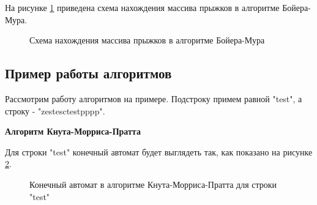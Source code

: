 \documentclass[a4paper, 14pt]{article}
\begin{document}
        На рисунке \ref{fig:jmp} приведена схема нахождения массива прыжков в алгоритме Бойера-Мура.\\
       \begin{figure}[h]
        	\caption{Схема нахождения массива прыжков в алгоритме Бойера-Мура}
        	\label{fig:jmp}
        \end{figure} 
        \newpage               
		\subsection{Пример работы алгоритмов}
		Рассмотрим работу алгоритмов на примере. Подстроку примем равной "test", а строку - "zestesctestpppp".
		
		\begin{center}
				\textbf{ Алгоритм Кнута-Морриса-Пратта}
		\end{center}
		Для строки "test" конечный автомат будет выглядеть так, как показано на рисунке \ref{fig:ka}.
       \begin{figure}[h]
        	\caption{Конечный автомат в алгоритме Кнута-Морриса-Пратта для строки "test"}
        	\label{fig:ka}
        \end{figure} 
        
\end{document}
